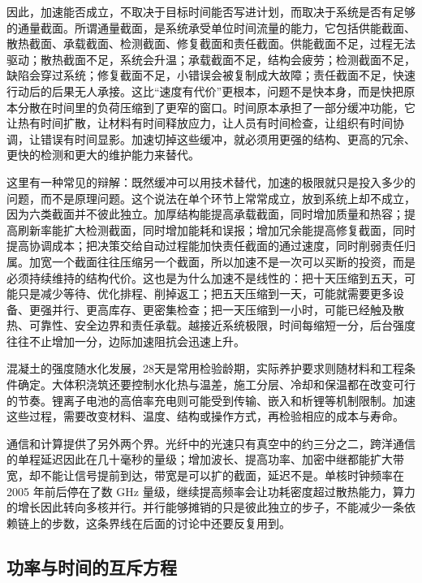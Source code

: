 因此，加速能否成立，不取决于目标时间能否写进计划，而取决于系统是否有足够的通量截面。所谓通量截面，是系统承受单位时间流量的能力，它包括供能截面、散热截面、承载截面、检测截面、修复截面和责任截面。供能截面不足，过程无法驱动；散热截面不足，系统会升温；承载截面不足，结构会疲劳；检测截面不足，缺陷会穿过系统；修复截面不足，小错误会被复制成大故障；责任截面不足，快速行动后的后果无人承接。这比“速度有代价”更根本，问题不是快本身，而是快把原本分散在时间里的负荷压缩到了更窄的窗口。时间原本承担了一部分缓冲功能，它让热有时间扩散，让材料有时间释放应力，让人员有时间检查，让组织有时间协调，让错误有时间显影。加速切掉这些缓冲，就必须用更强的结构、更高的冗余、更快的检测和更大的维护能力来替代。

这里有一种常见的辩解：既然缓冲可以用技术替代，加速的极限就只是投入多少的问题，而不是原理问题。这个说法在单个环节上常常成立，放到系统上却不成立，因为六类截面并不彼此独立。加厚结构能提高承载截面，同时增加质量和热容；提高刷新率能扩大检测截面，同时增加能耗和误报；增加冗余能提高修复截面，同时提高协调成本；把决策交给自动过程能加快责任截面的通过速度，同时削弱责任归属。加宽一个截面往往压缩另一个截面，所以加速不是一次可以买断的投资，而是必须持续维持的结构代价。这也是为什么加速不是线性的：把十天压缩到五天，可能只是减少等待、优化排程、削掉返工；把五天压缩到一天，可能就需要更多设备、更强并行、更高库存、更密集检查；把一天压缩到一小时，可能已经触及散热、可靠性、安全边界和责任承载。越接近系统极限，时间每缩短一分，后台强度往往不止增加一分，边际加速阻抗会迅速上升。

混凝土的强度随水化发展，28天是常用检验龄期，实际养护要求则随材料和工程条件确定。大体积浇筑还要控制水化热与温差，施工分层、冷却和保温都在改变可行的节奏。锂离子电池的高倍率充电则可能受到传输、嵌入和析锂等机制限制。加速这些过程，需要改变材料、温度、结构或操作方式，再检验相应的成本与寿命。

通信和计算提供了另外两个界。光纤中的光速只有真空中的约三分之二，跨洋通信的单程延迟因此在几十毫秒的量级；增加波长、提高功率、加密中继都能扩大带宽，却不能让信号提前到达，带宽是可以扩的截面，延迟不是。单核时钟频率在 2005 年前后停在了数 GHz 量级，继续提高频率会让功耗密度超过散热能力，算力的增长因此转向多核并行。并行能够摊销的只是彼此独立的步子，不能减少一条依赖链上的步数，这条界线在后面的讨论中还要反复用到。

\subsection{功率与时间的互斥方程}

